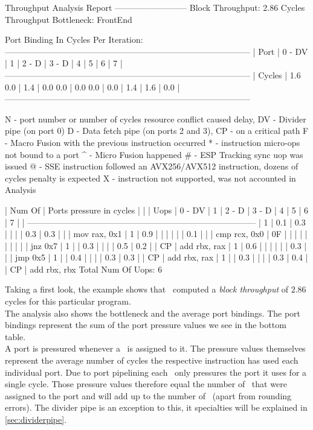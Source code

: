 \begin{example}
Throughput Analysis Report
--------------------------
Block Throughput: 2.86 Cycles       Throughput Bottleneck: FrontEnd

Port Binding In Cycles Per Iteration:
---------------------------------------------------------------------------------------
|  Port  |  0   -  DV  |  1   |  2   -  D   |  3   -  D   |  4   |  5   |  6   |  7   |
---------------------------------------------------------------------------------------
| Cycles | 1.6    0.0  | 1.4  | 0.0    0.0  | 0.0    0.0  | 0.0  | 1.4  | 1.6  | 0.0  |
---------------------------------------------------------------------------------------

N - port number or number of cycles resource conflict caused delay, DV - Divider pipe (on port 0)
D - Data fetch pipe (on ports 2 and 3), CP - on a critical path
F - Macro Fusion with the previous instruction occurred
* - instruction micro-ops not bound to a port
^ - Micro Fusion happened
# - ESP Tracking sync uop was issued
@ - SSE instruction followed an AVX256/AVX512 instruction, dozens of cycles penalty is expected
X - instruction not supported, was not accounted in Analysis

| Num Of |                    Ports pressure in cycles                     |    |
|  Uops  |  0  - DV  |  1  |  2  -  D  |  3  -  D  |  4  |  5  |  6  |  7  |    |
---------------------------------------------------------------------------------
|   1    | 0.1       | 0.3 |           |           |     | 0.3 | 0.3 |     |    | mov rax, 0x1
|   1    | 0.9       |     |           |           |     |     | 0.1 |     |    | cmp rcx, 0x0
|   0F   |           |     |           |           |     |     |     |     |    | jnz 0x7
|   1    |           | 0.3 |           |           |     | 0.5 | 0.2 |     | CP | add rbx, rax
|   1    | 0.6       |     |           |           |     |     | 0.3 |     |    | jmp 0x5
|   1    |           | 0.4 |           |           |     | 0.3 | 0.3 |     | CP | add rbx, rax
|   1    |           | 0.3 |           |           |     | 0.3 | 0.4 |     | CP | add rbx, rbx
Total Num Of Uops: 6
\end{example}

Taking a first look, the example shows that \iaca\ computed a \emph{block throughput} of $2.86$ cycles for this particular program.\\
The analysis also shows the bottleneck and the average port bindings. The port bindings represent the sum of the port pressure values we see in the bottom table.\\
A port is pressured whenever a \microop\ is assigned to it. The pressure values themselves represent the average number of cycles the respective instruction has used each individual port. Due to port pipelining each \microop\ only pressures the port it uses for a single cycle. Those pressure values therefore equal the number of \microops\ that were assigned to the port and will add up to the number of \microops\ (apart from rounding errors). The divider pipe is an exception to this, it specialties will be explained in \autoref{sec:dividerpipe}.
 
